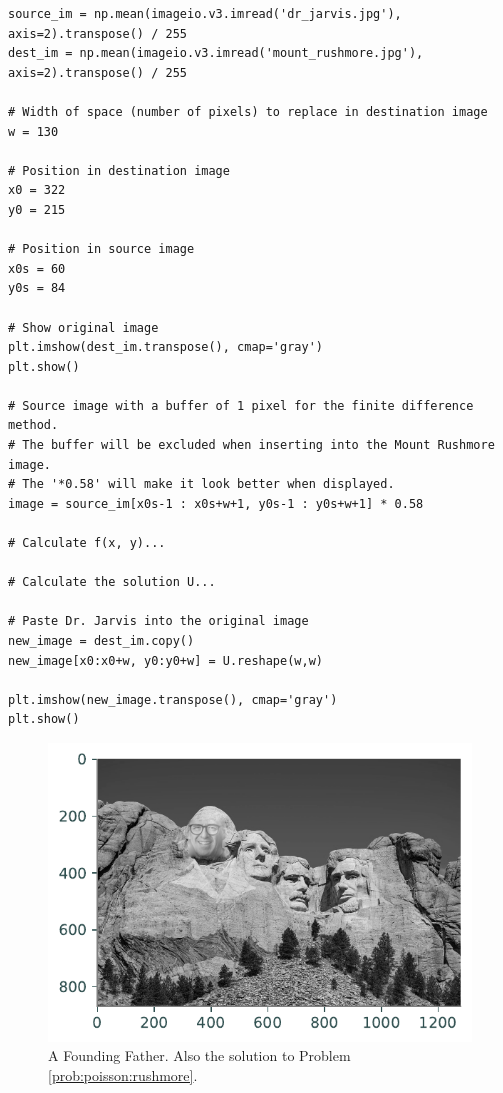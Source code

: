 \begin{problem}
\begin{lstlisting}
source_im = np.mean(imageio.v3.imread('dr_jarvis.jpg'), axis=2).transpose() / 255
dest_im = np.mean(imageio.v3.imread('mount_rushmore.jpg'), axis=2).transpose() / 255

# Width of space (number of pixels) to replace in destination image
w = 130

# Position in destination image
x0 = 322
y0 = 215

# Position in source image
x0s = 60 
y0s = 84

# Show original image
plt.imshow(dest_im.transpose(), cmap='gray')
plt.show()

# Source image with a buffer of 1 pixel for the finite difference method.
# The buffer will be excluded when inserting into the Mount Rushmore image.
# The '*0.58' will make it look better when displayed.
image = source_im[x0s-1 : x0s+w+1, y0s-1 : y0s+w+1] * 0.58

# Calculate f(x, y)...

# Calculate the solution U...

# Paste Dr. Jarvis into the original image
new_image = dest_im.copy()
new_image[x0:x0+w, y0:y0+w] = U.reshape(w,w)

plt.imshow(new_image.transpose(), cmap='gray')
plt.show()

\end{lstlisting}
\label{prob:poisson:rushmore}
\end{problem}

\begin{figure}[H]
\includegraphics[scale=0.7]{figures/mt_rushmore.pdf}
\caption{A Founding Father.
Also the solution to Problem \ref{prob:poisson:rushmore}.}
\label{poisson:mt_rushmore}
\end{figure}
